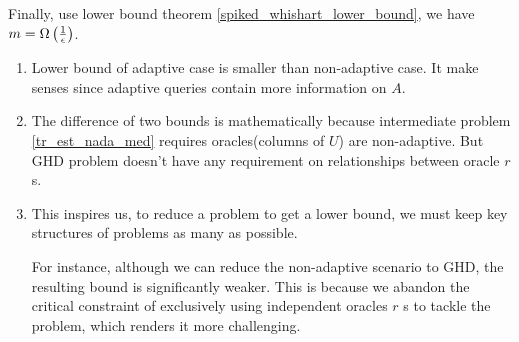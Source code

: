 {%




Finally, use lower bound theorem \ref{spiked_whishart_lower_bound}, we have $m=\Omega\left(\frac{1}{\epsilon}\right)$.
}

\begin{rmk}
\begin{enumerate}
    \item Lower bound of adaptive case is smaller than non-adaptive case. It make senses since adaptive queries contain more information on $A$.
    \item The difference of two bounds is mathematically because intermediate problem \ref{tr_est_nada_med} requires oracles(columns of $U$) are non-adaptive. But GHD problem doesn't have any requirement on relationships between oracle $r$ s.
    \item This inspires us, to reduce a problem to get a lower bound, we must keep key structures of problems as many as possible. 
    
    For instance, although we can reduce the non-adaptive scenario to GHD, the resulting bound is significantly weaker. This is because we abandon the critical constraint of exclusively using independent oracles $r$ s to tackle the problem, which renders it more challenging.
\end{enumerate}
\end{rmk}


